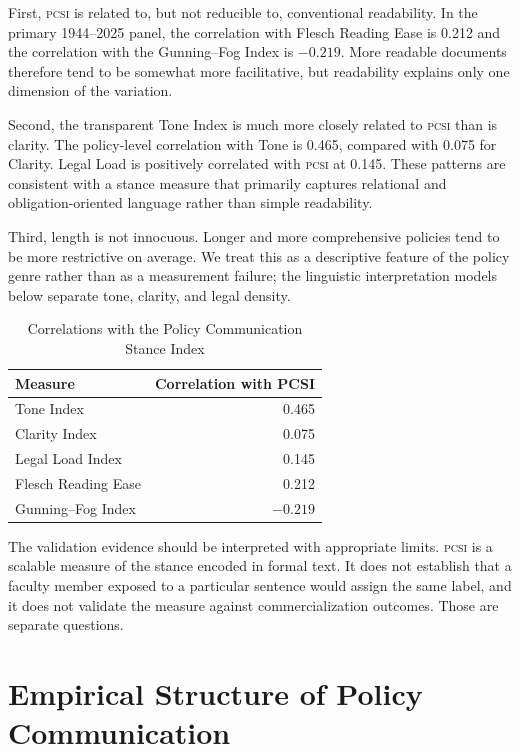 \documentclass[12pt]{article}
\newcommand{\PCSI}{\textsc{pcsi}}
\begin{document}
First, \PCSI{} is related to, but not reducible to, conventional readability. In the primary 1944--2025 panel, the correlation with Flesch Reading Ease is 0.212 and the correlation with the Gunning--Fog Index is $-0.219$. More readable documents therefore tend to be somewhat more facilitative, but readability explains only one dimension of the variation.

Second, the transparent Tone Index is much more closely related to \PCSI{} than is clarity. The policy-level correlation with Tone is 0.465, compared with 0.075 for Clarity. Legal Load is positively correlated with \PCSI{} at 0.145. These patterns are consistent with a stance measure that primarily captures relational and obligation-oriented language rather than simple readability.

Third, length is not innocuous. Longer and more comprehensive policies tend to be more restrictive on average. We treat this as a descriptive feature of the policy genre rather than as a measurement failure; the linguistic interpretation models below separate tone, clarity, and legal density.

\begin{table}[H]
\centering
\caption{Correlations with the Policy Communication Stance Index}
\label{tab:validity}
\small
\begin{tabular}{lr}
\toprule
\textbf{Measure} & \textbf{Correlation with PCSI}\\
\midrule
Tone Index & 0.465\\
Clarity Index & 0.075\\
Legal Load Index & 0.145\\
Flesch Reading Ease & 0.212\\
Gunning--Fog Index & $-0.219$\\
\bottomrule
\end{tabular}
\end{table}

The validation evidence should be interpreted with appropriate limits. \PCSI{} is a scalable measure of the stance encoded in formal text. It does not establish that a faculty member exposed to a particular sentence would assign the same label, and it does not validate the measure against commercialization outcomes. Those are separate questions.

\section{Empirical Structure of Policy Communication}
\end{document}
